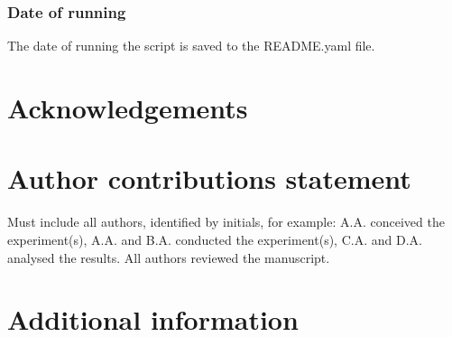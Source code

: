 \documentclass[fleqn,10pt]{wlscirep}
\begin{document}
\subsubsection*{Date of running}
The date of running the script is saved to the README.yaml file.







\section*{Acknowledgements}


\section*{Author contributions statement}

Must include all authors, identified by initials, for example:
A.A. conceived the experiment(s),  A.A. and B.A. conducted the experiment(s), C.A. and D.A. analysed the results.  All authors reviewed the manuscript. 

\section*{Additional information}



\end{document}
